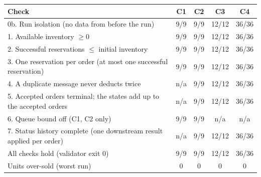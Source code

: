 \begin{tabular}{p{6.6cm}cccc}
\toprule
Check & C1 & C2 & C3 & C4 \\
\midrule
0b. Run isolation (no data from before the run) & 9/9 & 9/9 & 12/12 & 36/36 \\
1. Available inventory $\ge 0$ & 9/9 & 9/9 & 12/12 & 36/36 \\
2. Successful reservations $\le$ initial inventory & 9/9 & 9/9 & 12/12 & 36/36 \\
3. One reservation per order (at most one successful reservation) & 9/9 & 9/9 & 12/12 & 36/36 \\
4. A duplicate message never deducts twice & n/a & 9/9 & 12/12 & 36/36 \\
5. Accepted orders terminal; the states add up to the accepted orders & n/a & 9/9 & 12/12 & 36/36 \\
6. Queue bound off (C1, C2 only) & 9/9 & 9/9 & n/a & n/a \\
7. Status history complete (one downstream result applied per order) & n/a & 9/9 & 12/12 & 36/36 \\
\midrule
All checks hold (validator exit 0) & 9/9 & 9/9 & 12/12 & 36/36 \\
Units over-sold (worst run) & 0 & 0 & 0 & 0 \\
\bottomrule
\end{tabular}
